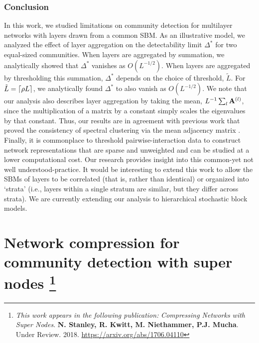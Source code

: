 \subsection{Conclusion}

In this work, we studied limitations on community detection for multilayer networks with layers drawn from a common SBM. As an illustrative model, we analyzed the effect of layer aggregation on the detectability limit $\Delta^{*}$ for two equal-sized communities. When layers are aggregated by summation, we analytically showed that $\Delta^{*}$ vanishes as $O(L^{-1/2})$. When layers are aggregated by thresholding this summation, $\Delta^{*}$ depends on the choice of threshold, $\tilde{L}$. For $\tilde{L}=\ceil*{\rho L}$, we analytically found $\Delta^{*}$ to also vanish as $O(L^{-1/2})$. We note that our analysis also describes layer aggregation by taking the mean, $L^{-1}\sum_{l}{\bf A}^{(l)}$, since the multiplication of a matrix by a constant simply scales the eigenvalues by that constant. Thus, our results are in agreement with previous work that proved the consistency of spectral clustering via the mean adjacency matrix \cite{airoldi}. \\
\indent Finally, it is commonplace to threshold pairwise-interaction data to construct network representations that are sparse and unweighted and can be studied at a lower computational cost. Our research provides insight into this common-yet not well understood-practice. It would be interesting to extend this work to allow the SBMs of layers to be correlated \cite{detect25} (that is, rather than identical) or organized into `strata' \cite{smlsbm} (i.e., layers within a single stratum are similar, but they differ across strata). We are currently extending our analysis to hierarchical stochastic block models. 


\chapter[Network compression for community detection with super nodes]{Network compression for community detection with super nodes \footnote{
       \emph{This work appears in the following publication:}
    \emph{Compressing Networks with Super Nodes}. {\bf N. Stanley, R. Kwitt, M. Niethammer, P.J. Mucha}. Under Review. 2018. \url{https://arxiv.org/abs/1706.04110}
}}

